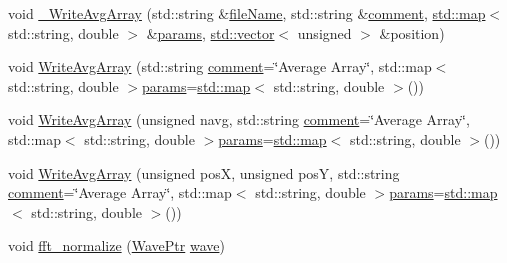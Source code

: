 \begin{DoxyCompactItemize}
\item 
void \hyperlink{class_q_s_t_e_m_1_1_c_experiment_base_a2624955a980b9bf2a76338ab126fffff}{\-\_\-\-Write\-Avg\-Array} (std\-::string \&\hyperlink{qmb_8m_a7a230f02bdffebd1357e3c0b49e01271}{file\-Name}, std\-::string \&\hyperlink{image_sim_8m_aea4cc4bd8e43a7f8ebf9b0ee3da8d681}{comment}, \hyperlink{_displacement_params_8m_af619c74fd72bdb64d115463dff2720cd}{std\-::map}$<$ std\-::string, double $>$ \&\hyperlink{image_sim_8m_ad57b218fb254a1624c09ad71cb6b6415}{params}, \hyperlink{qmb_8m_af54b69a32590de218622e869b06b47b3}{std\-::vector}$<$ unsigned $>$ \&position)
\item 
void \hyperlink{class_q_s_t_e_m_1_1_c_experiment_base_aef06a5659d2d3546ace2b1afa91572be}{Write\-Avg\-Array} (std\-::string \hyperlink{image_sim_8m_aea4cc4bd8e43a7f8ebf9b0ee3da8d681}{comment}=\char`\"{}Average Array\char`\"{}, std\-::map$<$ std\-::string, double $>$\hyperlink{image_sim_8m_ad57b218fb254a1624c09ad71cb6b6415}{params}=\hyperlink{_displacement_params_8m_af619c74fd72bdb64d115463dff2720cd}{std\-::map}$<$ std\-::string, double $>$())
\item 
void \hyperlink{class_q_s_t_e_m_1_1_c_experiment_base_aec64848dbcfbe16b115bf7ac8a2c8e92}{Write\-Avg\-Array} (unsigned navg, std\-::string \hyperlink{image_sim_8m_aea4cc4bd8e43a7f8ebf9b0ee3da8d681}{comment}=\char`\"{}Average Array\char`\"{}, std\-::map$<$ std\-::string, double $>$\hyperlink{image_sim_8m_ad57b218fb254a1624c09ad71cb6b6415}{params}=\hyperlink{_displacement_params_8m_af619c74fd72bdb64d115463dff2720cd}{std\-::map}$<$ std\-::string, double $>$())
\item 
void \hyperlink{class_q_s_t_e_m_1_1_c_experiment_base_ade7a7730a69116f347e73cc5846ebd8f}{Write\-Avg\-Array} (unsigned pos\-X, unsigned pos\-Y, std\-::string \hyperlink{image_sim_8m_aea4cc4bd8e43a7f8ebf9b0ee3da8d681}{comment}=\char`\"{}Average Array\char`\"{}, std\-::map$<$ std\-::string, double $>$\hyperlink{image_sim_8m_ad57b218fb254a1624c09ad71cb6b6415}{params}=\hyperlink{_displacement_params_8m_af619c74fd72bdb64d115463dff2720cd}{std\-::map}$<$ std\-::string, double $>$())
\item 
void \hyperlink{class_q_s_t_e_m_1_1_c_experiment_base_af6c490816f44c911f897789e6c13e093}{fft\-\_\-normalize} (\hyperlink{namespace_q_s_t_e_m_ab42c5fe058973736465964e84b504b74}{Wave\-Ptr} \hyperlink{sim_image_from_wave_8m_acb3ac767ec1048cf315487da2b577ca4}{wave})
\end{DoxyCompactItemize}
